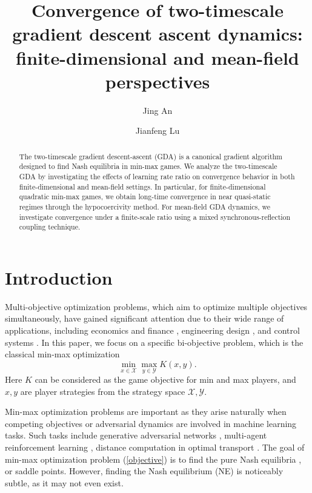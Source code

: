 \documentclass[11pt]{article}
\newcommand{\1}{\mathds{1}}
\begin{document}
\title{Convergence of two-timescale gradient descent ascent dynamics: finite-dimensional and mean-field perspectives}
\author{Jing An} 
\author{Jianfeng Lu}
\date{}
\maketitle
\numberbysection

\begin{abstract}
The two-timescale gradient descent-ascent (GDA) is a canonical gradient algorithm designed to find Nash equilibria in min-max games. We analyze the two-timescale GDA by investigating the effects of learning rate ratio on convergence behavior in both finite-dimensional and mean-field settings. In particular, for finite-dimensional quadratic min-max games, we obtain long-time convergence in near quasi-static regimes through the hypocoercivity method. For mean-field GDA dynamics, we investigate convergence under a finite-scale ratio using a mixed synchronous-reflection coupling technique.
\end{abstract}

\section{Introduction}
Multi-objective optimization problems, which aim to optimize multiple objectives simultaneously, have gained significant attention due to their wide range of applications, including economics and finance \cite{tapia2007applications}, engineering design \cite{andersson2000survey}, and control systems \cite{gambier2007multi}. In this paper, we focus on a specific bi-objective problem, which is the classical min-max optimization
\begin{equation}\label{objective}
    \min_{x\in\mathcal{X}} \max_{y\in\mathcal{Y}} K(x,y).
\end{equation}
Here $K$ can be considered as the game objective for min and max players, and $x, y$ are player strategies from the strategy space $\mathcal{X}, \mathcal{Y}$.  

Min-max optimization problems are important as they arise naturally when competing objectives or adversarial dynamics are involved in machine learning tasks. Such tasks include generative adversarial networks \cite{goodfellow2014generative}, multi-agent reinforcement learning \cite{busoniu2008comprehensive}, distance computation in optimal transport \cite{lin2020projection}. The goal of min-max optimization problem (\ref{objective}) is to find the pure Nash equilibria \cite{nash1951non}, or saddle points. However, finding the Nash equilibrium (NE) is noticeably subtle, as it may not even exist. 
\end{document}
